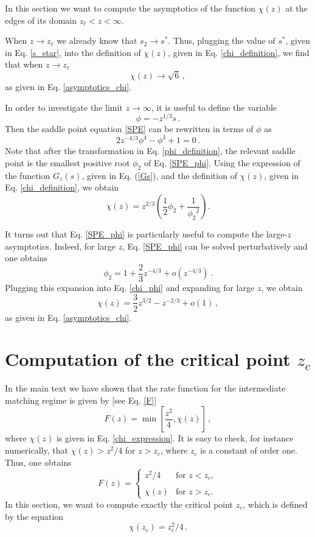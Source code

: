\documentclass[aps,pre,twocolumn,superscriptaddress,showpacs]{revtex4-1}
\newcommand{\be}{\begin{equation}}
\newcommand{\ee}{\end{equation}}
\begin{document}
In this section we want to compute the asymptotics of the function $\chi(z)$ at the edges of its domain $z_{\ell}<z<\infty$.

When $z\to z_{\ell}$ we already know that $s_2\to s^*$. Thus, plugging the value of $s^*$, given in Eq. \eqref{s_star}, into the definition of $\chi(z)$, given in Eq. \eqref{chi_definition}, we find that when $z\to z_{\ell}$
\be 
\chi(z)\to \sqrt{6}\,,
\ee
as given in Eq. \eqref{asymptotics_chi}.

In order to investigate the limit $z\to\infty$, it is useful to define the variable
\begin{equation}
\phi=-z^{1/3} s\,.
\label{phi_definition}
\end{equation}
Then the saddle point equation \eqref{SPE} can be rewritten in terms of $\phi$ as
\begin{equation}
2 z^{-4/3} \phi^4-\phi^3+1=0\,.
\label{SPE_phi}
\end{equation}
Note that after the transformation in Eq. \eqref{phi_definition}, the relevant saddle point is the smallest positive root $\phi_2$ of Eq. \eqref{SPE_phi}. Using the expression of the function $G_z(s)$, given in Eq. (\ref{Gs}), and the definition of $\chi(z)$, given in Eq. \eqref{chi_definition}, we obtain
\begin{equation}
\chi(z)=z^{2/3}\left(\frac12 \phi_2 +\frac{1}{{\phi_2}^2}\right).
\label{chi_phi}
\end{equation}

It turns out that Eq. \eqref{SPE_phi} is particularly useful to compute the large-$z$ asymptotics. Indeed, for large $z$, Eq. \eqref{SPE_phi} can be solved perturbatively and one obtains
\be 
\phi_2=1+\frac23 z^{-4/3}+o(z^{-4/3})\,.
\label{phi_asymptotics}
\ee
Plugging this expansion into Eq. \eqref{chi_phi} and expanding for large $z$, we obtain
\begin{equation}
\chi(z)=\frac32 z^{3/2}- z^{-2/3}+o(1)\,,
\end{equation}
as given in Eq. \eqref{asymptotics_chi}.


\section{Computation of the critical point $z_c$}
\label{app:zc}

In the main text we have shown that the rate function for the intermediate matching regime is given by [see Eq. \eqref{F}]
\be 
F(z)=\min\left[\frac{z^2}{4},\chi(z)\right]\,,
\ee
where $\chi(z)$ is given in Eq. \eqref{chi_expression}. It is easy to check, for instance numerically, that $\chi(z)>z^2/4$ for $z>z_c$, where $z_c$ is a constant of order one. Thus, one obtains 
\be
F(z)=
\begin{cases}
z^2/4 & \text{for } z<z_c,\\
\\
\chi(z) & \text{for } z>z_c.
\end{cases}
\ee
In this section, we want to compute exactly the critical point $z_c$, which is defined by the equation
\be 
\chi(z_c)=z_c^2/4\,.
\label{critical_equation}
\ee
\end{document}
